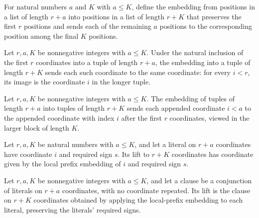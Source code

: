 \begin{definition}
\label{FABL.localPrefixEmbedding}
\leanok
For natural numbers $a$ and $K$ with $a\le K$, define the embedding from positions in a
list of length $r+a$ into positions in a list of length $r+K$ that preserves the first
$r$ positions and sends each of the remaining $a$ positions to the corresponding
position among the final $K$ positions.
\end{definition}

\begin{theorem}
\label{FABL.localPrefixEmbedding_castAdd}
\leanok
{}
Let $r,a,K$ be nonnegative integers with $a\le K$. Under the natural inclusion of the
first $r$ coordinates into a tuple of length $r+a$, the embedding into a tuple of length
$r+K$ sends each such coordinate to the same coordinate: for every $i<r$, its image is
the coordinate $i$ in the longer tuple.
\end{theorem}

\begin{theorem}
\label{FABL.localPrefixEmbedding_natAdd}
\leanok
{}
Let $r,a,K$ be nonnegative integers with $a\le K$. The embedding of tuples of length
$r+a$ into tuples of length $r+K$ sends each appended coordinate $i<a$ to the appended
coordinate with index $i$ after the first $r$ coordinates, viewed in the larger block of
length $K$.
\end{theorem}

\begin{definition}
\label{FABL.liftLocalLiteral}
\leanok
{}
Let $r,a,K$ be natural numbers with $a\le K$, and let a literal on $r+a$ coordinates
have coordinate $i$ and required sign $s$. Its lift to $r+K$ coordinates has coordinate
given by the local prefix embedding of $i$ and required sign $s$.
\end{definition}

\begin{definition}
\label{FABL.liftLocalClause}
\leanok
{}
Let $r,a,K$ be nonnegative integers with $a\le K$, and let a clause be a conjunction of
literals on $r+a$ coordinates, with no coordinate repeated. Its lift is the clause on
$r+K$ coordinates obtained by applying the local-prefix embedding to each literal,
preserving the literals’ required signs.
\end{definition}

